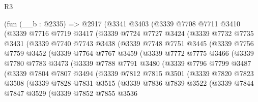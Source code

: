 \begin{lexlean}{R3}
\begin{coremodule}
    (fun (__b : @2335) =>
    @2917
      (@3341
        @3403
        (@3339
          @7708
          @7711
          @3410
          (@3339
            @7716
            @7719
            @3417
            (@3339
              @7724
              @7727
              @3424
              (@3339
                @7732
                @7735
                @3431
                (@3339
                  @7740
                  @7743
                  @3438
                  (@3339
                    @7748
                    @7751
                    @3445
                    (@3339
                      @7756
                      @7759
                      @3452
                      (@3339
                        @7764
                        @7767
                        @3459
                        (@3339
                          @7772
                          @7775
                          @3466
                          (@3339
                            @7780
                            @7783
                            @3473
                            (@3339
                              @7788
                              @7791
                              @3480
                              (@3339
                                @7796
                                @7799
                                @3487
                                (@3339
                                  @7804
                                  @7807
                                  @3494
                                  (@3339
                                    @7812
                                    @7815
                                    @3501
                                    (@3339
                                      @7820
                                      @7823
                                      @3508
                                      (@3339
                                        @7828
                                        @7831
                                        @3515
                                        (@3339
                                          @7836
                                          @7839
                                          @3522
                                          (@3339
                                            @7844
                                            @7847
                                            @3529
                                            (@3339
                                              @7852
                                              @7855
                                              @3536

\end{coremodule}
\end{lexlean}
